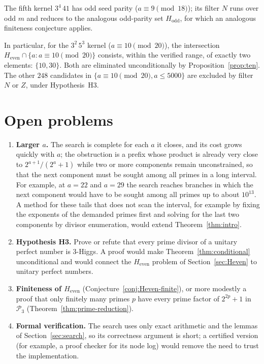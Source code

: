 \documentclass[11pt]{amsart}
\theoremstyle{plain}
\theoremstyle{definition}
\newcommand{\RESULTopen}{For example, at $a=22$ and $a=29$ the search reaches branches in which the next component would have to be sought among all primes up to about $10^{13}$.}
\begin{document}
The fifth kernel $3^4\,41$ has odd seed parity ($a \equiv 9 \pmod{18}$);
its filter $N$ runs over odd $m$ and reduces to the analogous odd-parity
set $H_{\mathrm{odd}}$, for which an analogous finiteness conjecture
applies.

In particular, for the $3^2\,5^3$ kernel ($a \equiv 10 \pmod{20}$), the
intersection $H_{\mathrm{even}} \cap \{a : a \equiv 10 \pmod{20}\}$
consists, within the verified range, of exactly two elements:
$\{10, 30\}$. Both are eliminated unconditionally by
Proposition~\ref{prop:ten}. The other $248$ candidates in
$\{a \equiv 10 \pmod{20}, a \le 5000\}$ are excluded by filter $N$
or $Z$, under Hypothesis~H3.

\section{Open problems}\label{sec:open}

\begin{enumerate}[label=(\arabic*),leftmargin=*]
\item \textbf{Larger $a$.}  The search is complete for each $a$ it closes, and
its cost grows quickly with $a$; the obstruction is a prefix whose product is
already very close to $2^{a+1}/(2^a+1)$ while two or more components remain
unconstrained, so that the next component must be sought among all primes in a
long interval.  \RESULTopen{}  A method for these tails that does not scan the
interval, for example by fixing the exponents of the demanded primes first and
solving for the last two components by divisor enumeration, would extend
Theorem~\ref{thm:intro}.

\item \textbf{Hypothesis H3.}  Prove or refute that every prime divisor of a
unitary perfect number is 3-Higgs.  A proof would make
Theorem~\ref{thm:conditional} unconditional and would connect the
$H_{\mathrm{even}}$ problem of Section~\ref{sec:Heven} to unitary perfect
numbers.

\item \textbf{Finiteness of $H_{\mathrm{even}}$} (Conjecture~\ref{conj:Heven-finite}),
or more modestly a proof that only finitely many primes $p$ have every prime
factor of $2^{2p}+1$ in $\mathcal P_3$ (Theorem~\ref{thm:prime-reduction}).

\item \textbf{Formal verification.}  The search uses only exact arithmetic and
the lemmas of Section~\ref{sec:search}, so its correctness argument is short;
a certified version (for example, a proof checker for its node log) would remove
the need to trust the implementation.
\end{enumerate}
\end{document}
